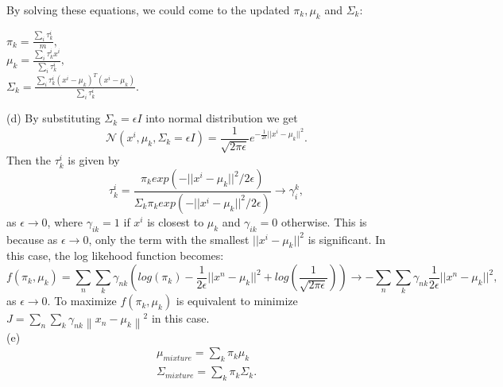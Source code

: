 \documentclass{article}
\begin{document}
By solving these equations, we could come to the updated $\pi_k, \mu_k$ and $\Sigma_k$:
\begin{center}
$\pi_k=\frac{\sum_i\tau_k^i}{m},$\\
$\mu_k=\frac{\sum_i\tau_k^ix^i}{\sum_i\tau_k^i},$\\
$\Sigma_k=\frac{\sum_i\tau_k^i(x^i-\mu_k)^T(x^i-\mu_k)}{\sum_i\tau_k^i}.$
\end{center}
(d) By substituting $\Sigma_k=\epsilon I$ into normal distribution we get
$$\mathcal{N}(x^i,\mu_k,\Sigma_k=\epsilon I)=\frac{1}{\sqrt{2\pi\epsilon}}e^{-\frac{1}{2\epsilon}||x^i-\mu_k||^2}.$$
Then the $\tau_k^i$ is given by
$$\tau_k^i=\frac{\pi_kexp(-||x^i-\mu_k||^2/2\epsilon)}{\Sigma_k\pi_kexp(-||x^i-\mu_k||^2/2\epsilon)}\rightarrow\gamma_i^k,$$
as $\epsilon\rightarrow0$, where $\gamma_{ik}=1$ if $x^i$ is closest to $\mu_k$ and $\gamma_{ik}=0$ otherwise. This is because as $\epsilon\rightarrow0$, only the term with the smallest $||x^i-\mu_k||^2$ is significant.
In this case, the log likehood function becomes:
$$f(\pi_k, \mu_k)=\sum_n\sum_k\gamma_{nk}(log(\pi_k)-\frac{1}{2\epsilon}||x^n-\mu_k||^2+log(\frac{1}{\sqrt{2\pi\epsilon}}))\rightarrow-\sum_n\sum_k\gamma_{nk}\frac{1}{2\epsilon}||x^n-\mu_k||^2,$$
as $\epsilon\rightarrow 0$. To maximize $f(\pi_k, \mu_k)$ is equivalent to minimize $J=\sum_n \sum_k \gamma_{n k}\left\|x_{n}-\mu_{k}\right\|^{2}$ in this case.\\
(e)
\begin{align*}
\mu_{mixture}=\sum_k\pi_k\mu_k\\
\Sigma_{mixture}=\sum_k\pi_k\Sigma_k.
\end{align*}
\end{document}
